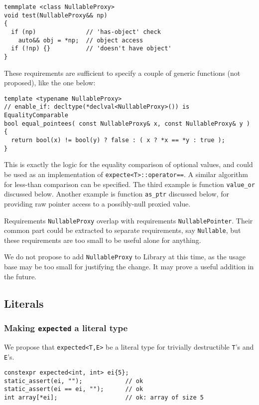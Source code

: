 \documentclass[a4paper,10pt]{article}
\newcommand{\cpp}[1]{\lstinline{#1}}
\begin{document}
\begin{lstlisting}
temmplate <class NullableProxy>
void test(NullableProxy&& np)
{
  if (np)              // 'has-object' check
    auto&& obj = *np;  // object access
  if (!np) {}          // 'doesn't have object'
}
\end{lstlisting}

These requirements are sufficient to specify a couple of generic functions (not proposed), like the one below:

\begin{lstlisting}
template <typename NullableProxy>
// enable_if: decltype(*declval<NullableProxy>()) is EqualityComparable
bool equal_pointees( const NullableProxy& x, const NullableProxy& y )
{
  return bool(x) != bool(y) ? false : ( x ? *x == *y : true );
}
\end{lstlisting}

This is exactly the logic for the equality comparison of optional values, and could be used as an implementation of \cpp{expecte<T>::operator==}. A similar algorithm for less-than comparison can be specified. The third example is function \cpp{value_or} discussed below. Another example is function \cpp{as_ptr} discussed below, for providing raw pointer access to a possibly-null proxied value.

Requirements \cpp{NullableProxy} overlap with requirements \cpp{NullablePointer}. Their common part could be extracted to separate requirements, say \cpp{Nullable}, but these requirements are too small to be useful alone for anything.

We do not propose to add \cpp{NullableProxy} to Library at this time, as the usage base may be too small for justifying the change. It may prove a useful addition in the future.

\subsection{Literals}

\subsubsection{Making \cpp{expected} a literal type}

We propose that \cpp{expected<T,E>} be a literal type for trivially destructible \cpp{T}'s and \cpp{E}'s.

\begin{lstlisting}
constexpr expected<int, int> ei{5};
static_assert(ei, "");            // ok
static_assert(ei == ei, "");      // ok
int array[*ei];                   // ok: array of size 5 
\end{lstlisting}
\end{document}
